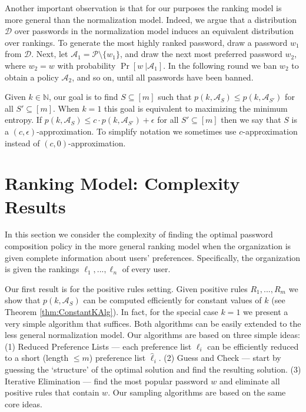 \documentclass[prodmode,acmec]{ec-acmsmall}
\newcommand{\PasswordSpace}{\mathcal{P}}
\begin{document}
Another important observation is that for our purposes the ranking model is more general than the normalization model. Indeed, we argue that a distribution $\mathcal{D}$ over passwords in the normalization model induces an equivalent distribution over rankings. To generate the most highly ranked password, draw a password $w_1$ from $\mathcal{D}$. Next, let $\mathcal{A}_1=\PasswordSpace\setminus\{w_1\}$, and draw the next most preferred password $w_2$, where $w_2=w$ with probability $\Pr[w\ |\mathcal{A}_1]$. In the following round we ban $w_2$ to obtain a policy $\mathcal{A}_2$, and so on, until all passwords have been banned. 

Given $k\in\mathbb{N}$, our goal is to find $S \subseteq [m]$ such that $p\left(k,\mathcal{A}_S\right) \leq p\left(k,\mathcal{A}_{S'}\right)$ for all $S' \subseteq [m]$. When $k=1$ this goal is equivalent to maximizing the minimum entropy. If $p\left(k,\mathcal{A}_S\right) \leq c\cdot p\left(k,\mathcal{A}_{S'}\right) + \epsilon$ for all $S' \subseteq [m]$ then we say that $S$ is a $(c,\epsilon)$-approximation. To simplify notation we sometimes use $c$-approximation instead of $(c,0)$-approximation. 


\section{Ranking Model: Complexity Results}
In this section we consider the complexity of finding the optimal password composition policy in the more general ranking model when the organization is given complete information about users' preferences. Specifically, the organization is given the rankings $\ell_1,...,\ell_n$ of every user. 

Our first result is for the positive rules setting. Given positive rules $R_1,...,R_m$ we show that $p\left(k,\mathcal{A}_S\right)$ can be computed efficiently for constant values of $k$ (see Theorem \ref{thm:ConstantKAlg}). In fact, for the special case $k=1$ we present a very simple algorithm that suffices. Both algorithms can be easily extended to the less general normalization model. Our algorithms are based on three simple ideas: (1) Reduced Preference Lists --- each preference list $\ell_i$ can be efficiently reduced to a short (length $\leq m$) preference list $\hat{\ell}_i$. (2) Guess and Check --- start by guessing the `structure' of the optimal solution and find the resulting solution. (3) Iterative Elimination --- find the most popular password $w$ and eliminate all positive rules that contain $w$. Our sampling algorithms are based on the same core ideas.
\end{document}
